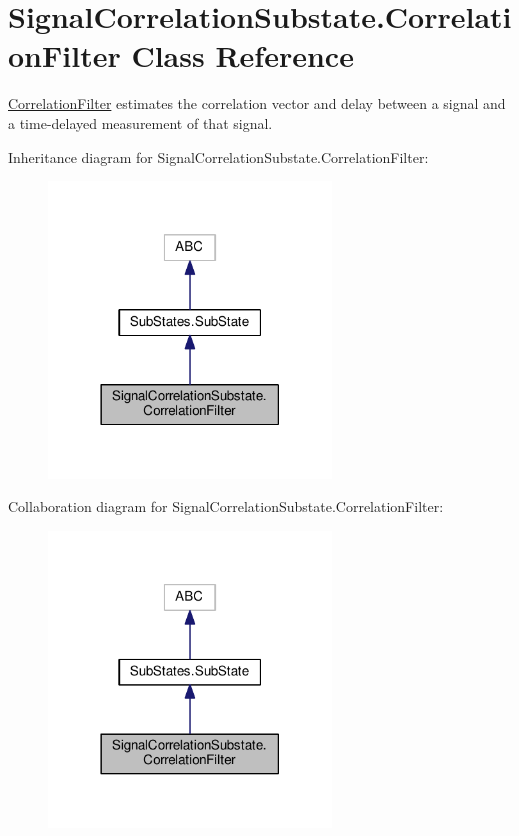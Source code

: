 \hypertarget{classSignalCorrelationSubstate_1_1CorrelationFilter}{}\section{Signal\+Correlation\+Substate.\+Correlation\+Filter Class Reference}
\label{classSignalCorrelationSubstate_1_1CorrelationFilter}


\hyperlink{classSignalCorrelationSubstate_1_1CorrelationFilter}{Correlation\+Filter} estimates the correlation vector and delay between a signal and a time-\/delayed measurement of that signal.  




Inheritance diagram for Signal\+Correlation\+Substate.\+Correlation\+Filter\+:\nopagebreak
\begin{figure}[H]
\begin{center}
\leavevmode
\includegraphics[width=213pt]{classSignalCorrelationSubstate_1_1CorrelationFilter__inherit__graph}
\end{center}
\end{figure}


Collaboration diagram for Signal\+Correlation\+Substate.\+Correlation\+Filter\+:\nopagebreak
\begin{figure}[H]
\begin{center}
\leavevmode
\includegraphics[width=213pt]{classSignalCorrelationSubstate_1_1CorrelationFilter__coll__graph}
\end{center}
\end{figure}
